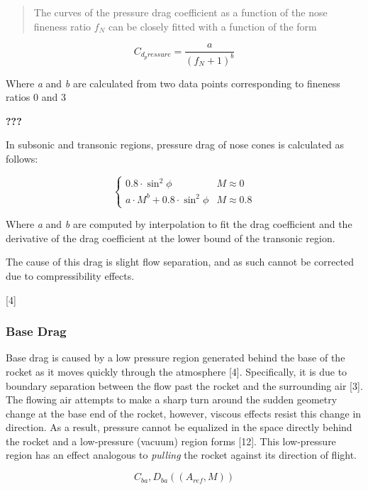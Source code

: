 \documentclass[]{book}
\begin{document}
\begin{quote}
The curves of the pressure drag coefficient as a function of the nose
fineness ratio \(f_N\) can be closely fitted with a function of the form
\end{quote}

\begin{equation}
C_{d_pressure} = \dfrac{a}{(f_N + 1)^b}
\end{equation}

Where \emph{a} and \emph{b} are calculated from two data points
corresponding to fineness ratios 0 and 3

{\textbf{???}}

In subsonic and transonic regions, pressure drag of nose cones is
calculated as follows:

\begin{equation}
\begin{cases}
    0.8 \cdot \sin^2 \phi               & M \approx 0 \\
    a \cdot M^b + 0.8 \cdot \sin^2 \phi & M \approx 0.8
\end{cases}
\end{equation}

Where \emph{a} and \emph{b} are computed by interpolation to fit the
drag coefficient and the derivative of the drag coefficient at the lower
bound of the transonic region.

The cause of this drag is slight flow separation, and as such cannot be
corrected due to compressibility effects.

{[}4{]}

\subsubsection{Base Drag}\label{base-drag}

Base drag is caused by a low pressure region generated behind the base
of the rocket as it moves quickly through the atmosphere {[}4{]}.
Specifically, it is due to boundary separation between the flow past the
rocket and the surrounding air {[}3{]}. The flowing air attempts to make
a sharp turn around the sudden geometry change at the base end of the
rocket, however, viscous effects resist this change in direction. As a
result, pressure cannot be equalized in the space directly behind the
rocket and a low-pressure (vacuum) region forms {[}12{]}. This
low-pressure region has an effect analogous to \emph{pulling} the rocket
against its direction of flight.

\begin{equation}
C_{ba}, D_{ba} ((A_{ref}, M)) 
\end{equation}
\end{document}
